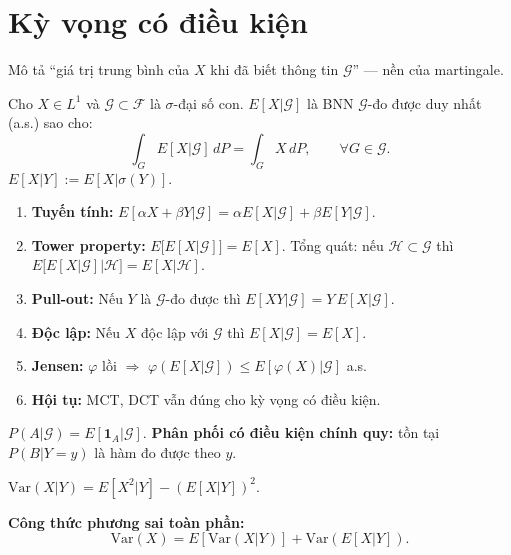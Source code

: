 \documentclass[12pt,a4paper]{article}
\begin{document}
\section{Kỳ vọng có điều kiện}

\begin{dongco}[title={Động cơ --- Kỳ vọng có điều kiện}]
Mô tả ``giá trị trung bình của $X$ khi đã biết thông tin $\mathcal{G}$'' --- nền của martingale.
\end{dongco}

\begin{dinhnghia}[title={Kỳ vọng có điều kiện theo $\sigma$-đại số}]
  Cho $X \in L^1$ và $\mathcal{G} \subset \mathcal{F}$ là $\sigma$-đại số con. $E[X|\mathcal{G}]$ là BNN $\mathcal{G}$-đo được duy nhất (a.s.) sao cho:
  \[
    \int_G E[X|\mathcal{G}]\,dP = \int_G X\,dP, \qquad \forall G \in \mathcal{G}.
  \]
  $E[X|Y] := E[X|\sigma(Y)]$.
\end{dinhnghia}

\begin{tinhchat}[title={Tính chất kỳ vọng có điều kiện}]
  \begin{enumerate}
    \item \textbf{Tuyến tính:} $E[\alpha X + \beta Y|\mathcal{G}] = \alpha E[X|\mathcal{G}] + \beta E[Y|\mathcal{G}]$.
    \item \textbf{Tower property:} $E\bigl[E[X|\mathcal{G}]\bigr] = E[X]$. Tổng quát: nếu $\mathcal{H} \subset \mathcal{G}$ thì $E\bigl[E[X|\mathcal{G}]\big|\mathcal{H}\bigr] = E[X|\mathcal{H}]$.
    \item \textbf{Pull-out:} Nếu $Y$ là $\mathcal{G}$-đo được thì $E[XY|\mathcal{G}] = Y\,E[X|\mathcal{G}]$.
    \item \textbf{Độc lập:} Nếu $X$ độc lập với $\mathcal{G}$ thì $E[X|\mathcal{G}] = E[X]$.
    \item \textbf{Jensen:} $\varphi$ lồi $\Rightarrow$ $\varphi(E[X|\mathcal{G}]) \le E[\varphi(X)|\mathcal{G}]$ a.s.
    \item \textbf{Hội tụ:} MCT, DCT vẫn đúng cho kỳ vọng có điều kiện.
  \end{enumerate}
\end{tinhchat}

\begin{dinhnghia}[title={Xác suất có điều kiện}]
  $P(A|\mathcal{G}) = E[\mathbf{1}_A|\mathcal{G}]$. \textbf{Phân phối có điều kiện chính quy:} tồn tại $P(B|Y = y)$ là hàm đo được theo $y$.
\end{dinhnghia}

\begin{congthuc}[title={Phương sai có điều kiện}]
  $\text{Var}(X|Y) = E[X^2|Y] - (E[X|Y])^2$.

  \textbf{Công thức phương sai toàn phần:}
  \[
    \text{Var}(X) = E[\text{Var}(X|Y)] + \text{Var}(E[X|Y]).
  \]
\end{congthuc}
\end{document}
